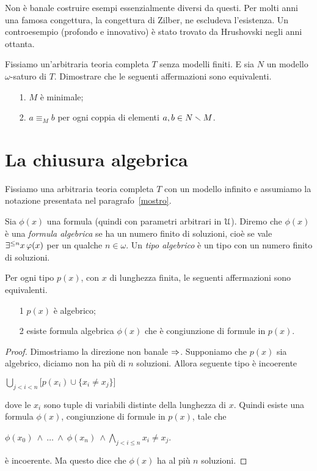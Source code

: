 Non \`e banale costruire esempi essenzialmente diversi da questi. Per molti anni una famosa congettura, la congettura di Zilber, ne escludeva l'esistenza. Un controesempio (profondo e innovativo) \`e stato trovato da Hrushovski negli anni ottanta.


\begin{exercise}
Fissiamo un'arbitraria teoria completa $T$ senza modelli finiti. E sia $N$ un modello $\omega$-saturo di $T$.  Dimostrare che le seguenti affermazioni sono equivalenti.
\begin{itemize}
\item[1.] $M$ \`e minimale;
\item[2.] $a\equiv_M b$ per ogni coppia di elementi $a,b\in N\smallsetminus M$.\QED
\end{itemize}
\end{exercise}


\section{La chiusura algebrica}\label{acl}

Fissiamo una arbitraria teoria completa $T$ con un modello infinito e assumiamo la notazione presentata nel paragrafo~\ref{mostro}.

Sia $\phi(x)$ una formula (quindi con parametri arbitrari in $\EuScript U$). Diremo che $\phi(x)$ \`e una \emph{formula algebrica\/} se ha un numero finito di soluzioni, cio\`e se vale $\exists^{\le n}x\,\varphi(x)$ per un qualche $n\in\omega$. Un \emph{tipo algebrico\/} \`e un tipo con un numero finito di soluzioni. 

\begin{proposition}\label{tipialgebrici}
Per ogni tipo $p(x)$, con $x$ di lunghezza finita, le seguenti affermazioni sono equivalenti.
\begin{itemize} 
\item[1] $p(x)$ \`e algebrico;
\item[2] esiste formula algebrica $\phi(x)$ che \`e congiunzione di formule in $p(x)$.
\end{itemize}
\end{proposition}
\begin{proof}
Dimostriamo la direzione non banale $\Rightarrow$. Supponiamo che $p(x)$ sia algebrico, diciamo non ha pi\`u di $n$ soluzioni. Allora seguente tipo \`e incoerente

\hfil$\displaystyle   \bigcup_{j<i<n}\big[p(x_i)\cup\{x_i\neq x_j\}\big]$

dove le $x_i$ sono tuple di variabili distinte della lunghezza di $x$. Quindi esiste una formula $\phi(x)$, congiunzione di formule in $p(x)$, tale che

\hfil$\displaystyle\phi(x_0)\ \wedge\ \dots\ \wedge\ \phi(x_n)\ \wedge\bigwedge_{j<i\le n}x_i\neq x_j$.

\`e incoerente. Ma questo dice che $\phi(x)$ ha al pi\`u $n$ soluzioni.
\end{proof}

